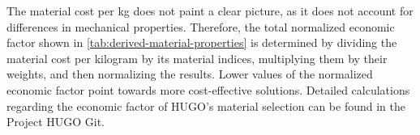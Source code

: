  The material cost per kg does not paint a clear picture, as it does not account for differences in mechanical properties. Therefore, the total normalized economic factor shown in \autoref{tab:derived-material-properties} is determined by dividing the material cost per kilogram by its material indices, multiplying them by their weights, and then normalizing the results.
Lower values of the normalized economic factor point towards more cost-effective solutions. Detailed calculations regarding the economic factor of HUGO's material selection can be found in the Project HUGO Git.





